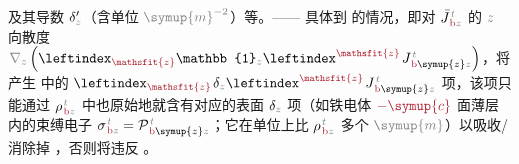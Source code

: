 及其导数 $\delta'_{\mathcolor{gray}{z}}$（含单位 $\mathcolor{gray}{\symup{m}^{-2}}$）等。—— 具体到  的情况，即对 $\bar{J}^{\;\!\mathcolor{gray}{t}}_{\;\!\textcolor{Maroon}{\text{b}}\mathcolor{gray}{z}}$ 的 $\mathcolor{gray}{z}$ 向散度 $\mathcolor{gray}{\nabla_z} \left( \leftindex_{\textcolor{Maroon}{\mathsfit{z}}} {\mathbb{1}}_{\mathcolor{gray}{z}} \leftindex^{\textcolor{Maroon}{\mathsfit{z}}} \;\! J^{\;\!\mathcolor{gray}{t}}_{\;\!\textcolor{Maroon}{\text{b}} \symup{z} \mathcolor{gray}{z}} \right)$，将产生  中的 $\leftindex_{\textcolor{Maroon}{\mathsfit{z}}} \;\! \delta_{\mathcolor{gray}{z}} \leftindex^{\textcolor{Maroon}{\mathsfit{z}}} \;\! J^{\;\!\mathcolor{gray}{t}}_{\;\!\textcolor{Maroon}{\text{b}} \symup{z} \mathcolor{gray}{z}}$ 项，该项只能通过 ${\rho}^{\;\!\mathcolor{gray}{t}}_{\;\!\textcolor{Maroon}{\text{b}}\mathcolor{gray}{z}}$ 中也原始地就含有对应的表面 $\delta_{\mathcolor{gray}{z}}$ 项（如铁电体 $\textcolor{Maroon}{-\symup{c}}$ 面薄层内的束缚电子 ${\sigma}^{\;\!\mathcolor{gray}{t}}_{\;\!\textcolor{Maroon}{\text{b}}\mathcolor{gray}{z}} = {\mathcal{P}}^{\;\!\mathcolor{gray}{t}}_{\;\!\textcolor{Maroon}{\text{b}} \symup{z} \mathcolor{gray}{z}}$；它在单位上比 ${\rho}^{\;\!\mathcolor{gray}{t}}_{\;\!\textcolor{Maroon}{\text{b}}\mathcolor{gray}{z}}$ 多个 $\mathcolor{gray}{\symup{m}}$）以吸收/消除掉 \cite{grahamMultipoleSolutionMacroscopic2000}，否则将违反 。

